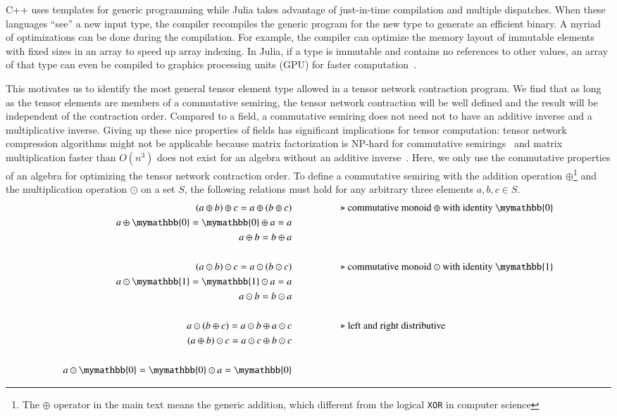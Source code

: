 \documentclass[review, onefignum, onetabnum]{siamart190516}
\begin{document}
C++ uses templates for generic programming while Julia takes advantage of just-in-time compilation and multiple dispatches.
When these languages ``see'' a new input type, the compiler recompiles the generic program for the new type to generate an efficient binary.
A myriad of optimizations can be done during the compilation. For example, the compiler can optimize the memory layout of immutable elements with fixed sizes in an array to speed up array indexing.
In Julia, if a type is immutable and contains no references to other values, an array of that type can even be compiled to graphics processing units (GPU) for faster computation~\cite{Besard2018}.

This motivates us to identify the most general tensor element type allowed in a tensor network contraction program.
We find that as long as the tensor elements are members of a commutative semiring, the tensor network contraction will be well defined and the result will be independent of the contraction order.
Compared to a field, a commutative semiring does not need not to have an additive inverse and a multiplicative inverse.
Giving up these nice properties of fields has significant implications for tensor computation: tensor network compression algorithms might not be applicable because matrix factorization is NP-hard for commutative semirings~\cite{Shitov2014} and matrix multiplication faster than $O(n^3)$ does not exist for an algebra without an additive inverse~\cite{Kerr1970}.
Here, we only use the commutative properties of an algebra for optimizing the tensor network contraction order.
To define a commutative semiring with the addition operation $\oplus$\footnote{The $\oplus$ operator in the main text means the generic addition, which different from the logical \texttt{XOR} in computer science} and the multiplication operation $\odot$ on a set $S$, the following relations must hold for any arbitrary three elements $a, b, c \in S$.
\begin{align*}
(a \oplus b) \oplus c = a \oplus (b \oplus c) & \hspace{5em}\text{$\triangleright$ commutative monoid $\oplus$ with identity $\mymathbb{0}$}\\
a \oplus \mymathbb{0} = \mymathbb{0} \oplus a = a &\\
a \oplus b = b \oplus a &\\
&\\
(a \odot b) \odot c = a \odot (b \odot c)  &   \hspace{5em}\text{$\triangleright$ commutative monoid $\odot$ with identity $\mymathbb{1}$}\\
a \odot  \mymathbb{1} =  \mymathbb{1} \odot a = a &\\
a \odot b = b \odot a &\\
&\\
a \odot (b\oplus c) = a\odot b \oplus a\odot c  &  \hspace{5em}\text{$\triangleright$ left and right distributive}\\
(a\oplus b) \odot c = a\odot c \oplus b\odot c &\\
&\\
a \odot \mymathbb{0} = \mymathbb{0} \odot a = \mymathbb{0}
\end{align*}
\end{document}
